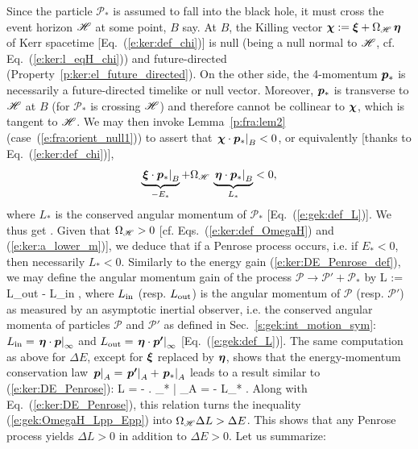 Since the particle $\mathscr{P}_*$ is assumed to fall into the black hole,
it must cross the event horizon $\mathscr{H}$ at some point, $B$ say. At $B$, the
Killing vector $\bm{\chi} := \bm{\xi} + \Omega_{\mathscr{H}} \, \bm{\eta}$ of Kerr spacetime [Eq.~(\ref{e:ker:def_chi})] is null (being a null normal to $\mathscr{H}$, cf. Eq.~(\ref{e:ker:l_eqH_chi}))
and future-directed (Property~\ref{p:ker:el_future_directed}).
On the other side, the
4-momentum $\bm{p}_*$ is necessarily a future-directed timelike or null vector.
Moreover, $\bm{p}_*$
is transverse to $\mathscr{H}$ at $B$ (for $\mathscr{P}_*$ is crossing $\mathscr{H}$)
and therefore cannot be collinear to $\bm{\chi}$, which is tangent to $\mathscr{H}$.
We may then invoke Lemma~\ref{p:fra:lem2} (case~(\ref{e:fra:orient_null1}))
to assert that $\left. \bm{\chi}\cdot\bm{p}_* \right| _B < 0$, or equivalently
[thanks to Eq.~(\ref{e:ker:def_chi})],
\[
    \underbrace{\left.\bm{\xi}\cdot\bm{p}_* \right| _B}_{-E_*}
    + \Omega_{\mathscr{H}} \, \underbrace{\left.\bm{\eta}\cdot\bm{p}_* \right| _B}_{L_*} < 0 ,
\]
where $L_*$ is the conserved angular momentum of $\mathscr{P}_*$ [Eq.~(\ref{e:gek:def_L})].
We thus get
\be \label{e:gek:OmegaH_Lpp_Epp}
    .
\ee
Given that $\Omega_{\mathscr{H}} > 0$ [cf. Eqs.~(\ref{e:ker:def_OmegaH}) and (\ref{e:ker:a_lower_m})],
we deduce that if a Penrose process occurs, i.e. if $E_* < 0$, then necessarily $L_* < 0$.
Similarly to the energy gain (\ref{e:ker:DE_Penrose_def}), we may define the
angular momentum gain of the process $\mathscr{P} \to \mathscr{P}' + \mathscr{P}_*$ by
\be
    \Delta L := L_{\rm out} - L_{\rm in} ,
\ee
where $L_{\rm in}$ (resp. $L_{\rm out}$) is the angular momentum of $\mathscr{P}$
(resp. $\mathscr{P}'$) as measured by an asymptotic inertial observer, i.e.
the conserved angular momenta of particles $\mathscr{P}$ and $\mathscr{P}'$
as defined in Sec.~\ref{s:gek:int_motion_sym}:
$L_{\rm in} =  \left.  \bm{\eta} \cdot \bm{p} \right| _{\infty}$
and
$L_{\rm out} = \left.  \bm{\eta} \cdot \bm{p'} \right| _{\infty}$
[Eq.~(\ref{e:gek:def_L})]. The same computation as above for
$\Delta E$, except for $\bm{\xi}$ replaced by $\bm{\eta}$, shows that the
energy-momentum conservation law
$\left. \bm{p} \right| _{A} = \left. \bm{p'} \right| _{A} + \left. \bm{p}_* \right| _{A}$
leads to a result similar to (\ref{e:ker:DE_Penrose}):
\be
    \Delta L = - \left. \w{\eta} \cdot {}_* \right| _{A} = - L_* .
\ee
Along with Eq.~(\ref{e:ker:DE_Penrose}), this relation turns the inequality
(\ref{e:gek:OmegaH_Lpp_Epp}) into $\Omega_{\mathscr{H}}\Delta L > \Delta E$.
This shows that any Penrose process yields $\Delta L > 0$ in addition to
$\Delta E > 0$. Let us summarize:



